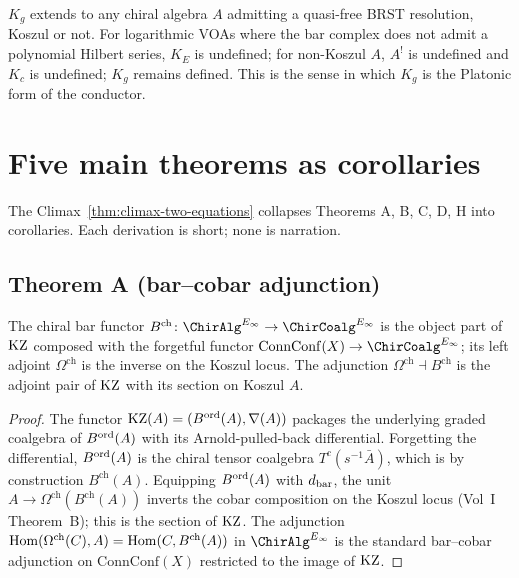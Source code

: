 \begin{remark}
\(K_{g}\) extends to any chiral algebra \(A\) admitting a quasi-free
BRST resolution, Koszul or not. For logarithmic VOAs where the bar
complex does not admit a polynomial Hilbert series, \(K_{E}\) is
undefined; for non-Koszul \(A\), \(A^{!}\) is undefined and \(K_{c}\)
is undefined; \(K_{g}\) remains defined. This is the sense in which
\(K_{g}\) is the Platonic form of the conductor.
\end{remark}

\section{Five main theorems as corollaries}
\label{sec:climax-theorems-as-corollaries}

The Climax~\ref{thm:climax-two-equations} collapses Theorems
A, B, C, D, H into corollaries. Each derivation is short; none is
narration.

\subsection{Theorem A (bar--cobar adjunction)}
\label{subsec:climax-thmA}

\begin{corollary}
\label{cor:thmA-from-climax}
\ClaimStatusProvedHere
The chiral bar functor
\(B^{\mathrm{ch}}\colon \ChirAlgInf \to \ChirCoalg^{E_{\infty}}\) is
the object part of \(\mathrm{KZ}\) composed with the forgetful functor
\(\mathrm{ConnConf}(X) \to \ChirCoalg^{E_{\infty}}\); its left adjoint
\(\Omega^{\mathrm{ch}}\) is the inverse on the Koszul locus. The
adjunction \(\Omega^{\mathrm{ch}} \dashv B^{\mathrm{ch}}\) is the
adjoint pair of \(\mathrm{KZ}\) with its section on Koszul \(A\).
\end{corollary}

\begin{proof}
The functor \(\mathrm{KZ}(A) = (B^{\mathrm{ord}}(A), \nabla(A))\) packages the underlying
graded coalgebra of \(B^{\mathrm{ord}}(A)\) with its Arnold-pulled-back
differential. Forgetting the differential, \(B^{\mathrm{ord}}(A)\) is the chiral
tensor coalgebra \(T^{c}(s^{-1}\bar A)\), which is by construction
\(B^{\mathrm{ch}}(A)\). Equipping \(B^{\mathrm{ord}}(A)\) with \(d_{\mathrm{bar}}\), the
unit \(A \to \Omega^{\mathrm{ch}}(B^{\mathrm{ch}}(A))\) inverts the
cobar composition on the Koszul locus (Vol~I Theorem~B); this is the
section of \(\mathrm{KZ}\). The adjunction
\(\mathrm{Hom}(\Omega^{\mathrm{ch}}(C), A) = \mathrm{Hom}(C, B^{\mathrm{ch}}(A))\) in
\(\ChirAlgInf\) is the standard bar--cobar adjunction on
\(\mathrm{ConnConf}(X)\) restricted to the image of \(\mathrm{KZ}\).
\end{proof}

